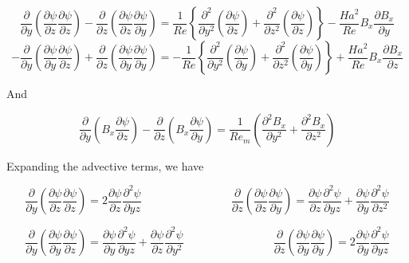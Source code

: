\documentclass[11pt]{article}
\begin{document}
\begin{equation}
	\frac{\partial}{\partial y}
	\left(
	\frac{\partial \psi}{\partial z}
	\frac{\partial \psi}{\partial z}
	\right)
	-
	\frac{\partial}{\partial z}
	\left(
	\frac{\partial \psi}{\partial z}
	\frac{\partial \psi}{\partial y}
	\right)
	= 
	\frac{1}{Re}
	\left\{
	\frac{\partial^2}{\partial y^2}
	\left(
	\frac{\partial \psi}{\partial z}
	\right)
	+
	\frac{\partial^2}{\partial z^2}
	\left(
	\frac{\partial \psi}{\partial z}
	\right)
	\right\}
	- 
	\frac{Ha^2}{Re}
	B_x
	\frac{\partial B_x}{\partial y} 
\end{equation}
\begin{equation}
	-\frac{\partial}{\partial y}
	\left(
	\frac{\partial \psi}{\partial y}
	\frac{\partial \psi}{\partial z}
	\right)
	+ \frac{\partial}{\partial z}
	\left(
	\frac{\partial \psi}{\partial y}
	\frac{\partial \psi}{\partial y}
	\right)
	= 
	- \frac{1}{Re}
	\left\{
	\frac{\partial^2}{\partial y^2}
	\left(
	\frac{\partial \psi}{\partial y}
	\right)
	+\frac{\partial^2}{\partial z^2}
	\left(
	\frac{\partial \psi}{\partial y}
	\right)
	\right\}
	+ \frac{Ha^2}{Re}
	B_x
	\frac{\partial B_x}{\partial z} 
\end{equation}

And

\begin{equation}
	\frac{\partial}{\partial y} \left( B_x \frac{\partial \psi}{\partial z} \right)
	- \frac{\partial}{\partial z} \left( B_x \frac{\partial \psi}{\partial y} \right)
	=
	\frac{1}{Re_m}
	\left(
	\frac{\partial^2 B_x}{\partial y^2}
	+ \frac{\partial^2 B_x}{\partial z^2}
	\right)
\end{equation}

Expanding the advective terms, we have

\begin{equation}
	\frac{\partial}{\partial y}
	\left(
	\frac{\partial \psi}{\partial z}
	\frac{\partial \psi}{\partial z}
	\right)
	=
	2
	\frac{\partial \psi }{\partial z}
	\frac{\partial^2 \psi}{\partial yz}
	\qquad \qquad
	\qquad \qquad
	\frac{\partial}{\partial z}
	\left(
	\frac{\partial \psi}{\partial z}
	\frac{\partial \psi}{\partial y}
	\right)
	=
	\frac{\partial \psi}{\partial z}
	\frac{\partial^2 \psi}{\partial yz} +
	\frac{\partial \psi}{\partial y}
	\frac{\partial^2 \psi}{\partial z^2}
\end{equation}

\begin{equation}
	\frac{\partial}{\partial y}
	\left(
	\frac{\partial \psi}{\partial y}
	\frac{\partial \psi}{\partial z}
	\right)
	=
	\frac{\partial \psi}{\partial y}
	\frac{\partial^2 \psi}{\partial yz} +
	\frac{\partial \psi}{\partial z}
	\frac{\partial^2 \psi}{\partial y^2}
	\qquad \qquad
	\qquad \qquad
	\frac{\partial}{\partial z}
	\left(
	\frac{\partial \psi}{\partial y}
	\frac{\partial \psi}{\partial y}
	\right)
	=
	2
	\frac{\partial \psi }{\partial y}
	\frac{\partial^2 \psi}{\partial yz}
\end{equation}
\end{document}
